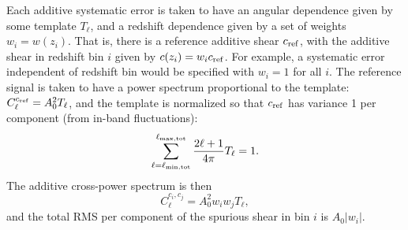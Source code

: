 \documentclass[usenatbib]{mnras}
\begin{document}
\begin{table}
\caption{The requirements for additive and multiplicative systematic errors. There are $N_{\rm band}=4$ additive error bands ranging over a total signal band from $\ell_{\rm min,tot}=10$ to $\ell_{\rm max,tot}=3161$. The fraction of the error budget allocated to each band is also indicated, as are the maximum allowed redshift-independent spurious shear ($A_0^{\rm flat}(\alpha)$, RMS per component), and the maximum scaling factors for redshift dependence, $S_{\rm max,\pm}(\alpha)$ and $S_{\rm max,+}(\alpha)$. There is only one row for the multiplicative errors, since the implementation does not contain an $\ell$ dependence; we quote a requirement on the post-calibration shear multiplicative uncertainty $\sigma_{m,\rm req't}^{\rm flat}$.
\label{tab:addbands}}
\end{table}

Each additive systematic error is taken to have an angular dependence
given by some template $T_\ell$, and a redshift dependence given by a
set of weights $w_i=w(z_i)$. That is, there is a reference additive
shear $c_{\rm ref}$, with the additive shear in redshift bin $i$ given
by $c(z_i) = w_ic_{\rm ref}$. For example, a systematic error
independent of redshift bin would be specified with $w_i=1$ for all
$i$. The reference signal is taken to have a power spectrum
proportional to the template: $C_\ell^{c_{\rm ref}} = A_0^2T_\ell$,
and the template is normalized so that $c_{\rm ref}$ has variance 1
per component (from in-band fluctuations):
\begin{equation}
\sum_{\ell=\ell_{\rm min,tot}}^{\ell_{\rm max,tot}} \frac{2\ell+1}{4\pi} T_\ell = 1.
\label{eq:Tlsum}
\end{equation}
The additive cross-power spectrum is then
\begin{equation}
C_\ell^{c_i,c_j} = A_0^2 w_iw_jT_\ell,
\end{equation}
and the total RMS per component of the spurious shear in bin $i$ is $A_0|w_i|$.
\end{document}
